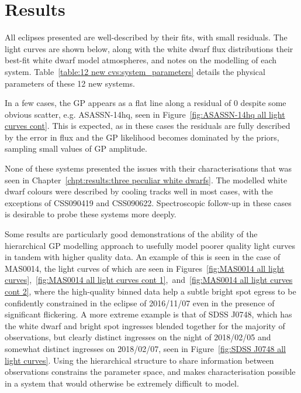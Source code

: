 

\section{Results}
\label{sect:results:12 new CVs:results}

All eclipses presented are well-described by their fits, with small residuals. The light curves are shown below, along with the white dwarf flux distributions their best-fit white dwarf model atmospheres, and notes on the modelling of each system.
Table~\ref{table:12 new cvs:system_parameters} details the physical parameters of these 12 new systems.

In a few cases, the GP appears as a flat line along a residual of 0 despite some obvious scatter, e.g. ASASSN-14hq, seen in Figure~\ref{fig:ASASSN-14hq all light curves cont}. This is expected, as in these cases the residuals are fully described by the error in flux and the GP likelihood becomes dominated by the priors, sampling small values of GP amplitude.

None of these systems presented the issues with their characterisations that was seen in Chapter~\ref{chpt:results:three peculiar white dwarfs}. The modelled white dwarf colours were described by cooling tracks well in most cases, with the exceptions of CSS090419 and CSS090622. Spectroscopic follow-up in these cases is desirable to probe these systems more deeply.

Some results are particularly good demonstrations of the ability of the hierarchical GP modelling approach to usefully model poorer quality light curves in tandem with higher quality data.
An example of this is seen in the case of MAS0014, the light curves of which are seen in Figures~\ref{fig:MAS0014 all light curves},~\ref{fig:MAS0014 all light curves cont 1},~and~\ref{fig:MAS0014 all light curves cont 2}, where the high-quality binned data help a subtle bright spot egress to be confidently constrained in the eclipse of 2016/11/07 even in the presence of significant flickering.
A more extreme example is that of SDSS J0748, which has the white dwarf and bright spot ingresses blended together for the majority of observations, but clearly distinct ingresses on the night of 2018/02/05 and somewhat distinct ingresses on 2018/02/07, seen in Figure~\ref{fig:SDSS J0748 all light curves}.
Using the hierarchical structure to share information between observations constrains the parameter space, and makes characterisation possible in a system that would otherwise be extremely difficult to model.

